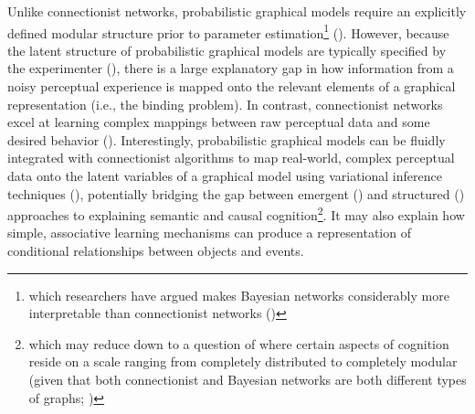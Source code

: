 \documentclass[12pt]{article}
\let\oldcite=\cite
\renewcommand{\cite}[1]{\textcolor[rgb]{0, .121, .388}{\oldcite{#1}}}
\begin{document}
Unlike connectionist networks, probabilistic graphical models require an explicitly defined modular structure prior to parameter estimation\footnote{which researchers have argued makes Bayesian networks considerably more interpretable than connectionist networks (\cite{griffiths2010probabilistic})} (\cite{griffiths2010probabilistic}). However, because the latent structure of probabilistic graphical models are typically specified by the experimenter (\cite{mcclelland2010letting}), there is a large explanatory gap in how information from a noisy perceptual experience is mapped onto the relevant elements of a graphical representation (i.e., the binding problem). In contrast, connectionist networks excel at learning complex mappings between raw perceptual data and some desired behavior (\cite{lecun2015deep,he2015delving}). Interestingly, probabilistic graphical models can be fluidly integrated with connectionist algorithms to map real-world, complex perceptual data onto the latent variables of a graphical model using variational inference techniques (\cite{johnson2016composing}), potentially bridging the gap between emergent (\cite{mcclelland2010letting}) and structured (\cite{griffiths2010probabilistic}) approaches to explaining semantic and causal cognition\footnote{which may reduce down to a question of where certain aspects of cognition reside on a scale ranging from completely distributed to completely modular (given that both connectionist and Bayesian networks are both different types of graphs; \cite{griffiths2010probabilistic})}. It may also explain how simple, associative learning mechanisms can produce a representation of conditional relationships between objects and events.
\end{document}
